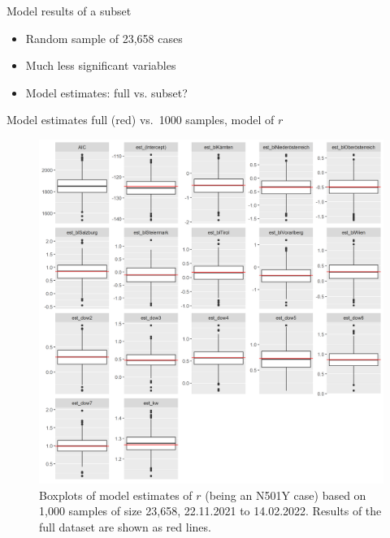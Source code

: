 \documentclass[
  ignorenonframetext,
  aspectratio=169,
]{beamer}
\begin{document}
\begin{frame}{Model results of a subset}
\begin{minipage}{.60\textwidth}
\end{minipage}
\begin{minipage}{.30\textwidth}

\begin{itemize}
\item Random sample of 23,658 cases
\item Much less significant variables
\item Model estimates: full vs. subset?
\end{itemize}

\end{minipage}
\end{frame}

\begin{frame}{Model estimates full (red) vs.~1000 samples, model of
\(r\)}
\protect\hypertarget{model-estimates-full-red-vs.-1000-samples-model-of-r}{}
\begin{minipage}{.60\textwidth}
\begin{figure}
  \centering
  \includegraphics[height=0.8\textheight,keepaspectratio]{img/impute_omi_subset_samples_model_n501_estimates.png}
  \caption{Boxplots of model estimates of $r$ (being an N501Y case) based on 1,000 samples of size 23,658, 22.11.2021 to 14.02.2022. Results of the full dataset are shown as red lines.}
\end{figure}


\end{minipage}
\end{frame}
\end{document}
